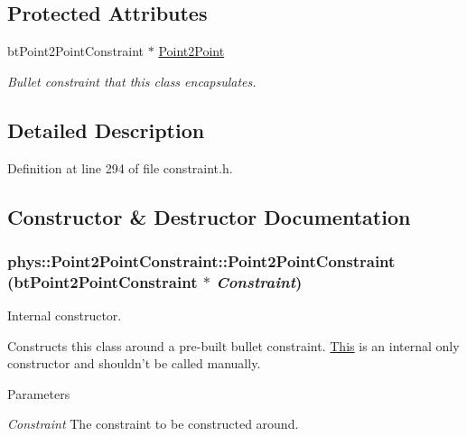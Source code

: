 \subsection*{Protected Attributes}
\begin{DoxyCompactItemize}
\item 
\hypertarget{classphys_1_1Point2PointConstraint_aa58b7fd9fe368c72d5bc5e1990bdf593}{
btPoint2PointConstraint $\ast$ \hyperlink{classphys_1_1Point2PointConstraint_aa58b7fd9fe368c72d5bc5e1990bdf593}{Point2Point}}
\label{da/dfb/classphys_1_1Point2PointConstraint_aa58b7fd9fe368c72d5bc5e1990bdf593}

\begin{DoxyCompactList}\small\item\em Bullet constraint that this class encapsulates. \item\end{DoxyCompactList}\end{DoxyCompactItemize}


\subsection{Detailed Description}


Definition at line 294 of file constraint.h.



\subsection{Constructor \& Destructor Documentation}
\hypertarget{classphys_1_1Point2PointConstraint_a73c530c760f31032e23955567f634978}{
\subsubsection[{Point2PointConstraint}]{\setlength{\rightskip}{0pt plus 5cm}phys::Point2PointConstraint::Point2PointConstraint (btPoint2PointConstraint $\ast$ {\em Constraint})}}
\label{da/dfb/classphys_1_1Point2PointConstraint_a73c530c760f31032e23955567f634978}


Internal constructor. 

Constructs this class around a pre-\/built bullet constraint. \hyperlink{structThis}{This} is an internal only constructor and shouldn't be called manually. 
\begin{DoxyParams}{Parameters}
\item[{\em Constraint}]The constraint to be constructed around. \end{DoxyParams}



